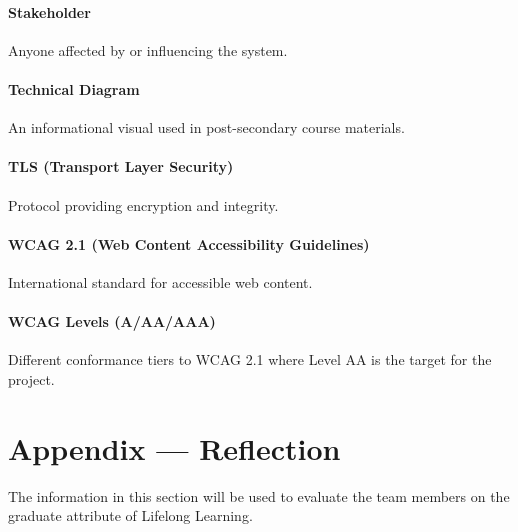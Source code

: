 \documentclass[12pt, titlepage]{article}
\begin{document}
\paragraph*{Stakeholder}
Anyone affected by or influencing the system.

\paragraph*{Technical Diagram}
An informational visual used in post-secondary course materials.

\paragraph*{TLS (Transport Layer Security)}
Protocol providing encryption and integrity.

\paragraph*{WCAG 2.1 (Web Content Accessibility Guidelines)}
International standard for accessible web content.

\paragraph*{WCAG Levels (A/AA/AAA)}
Different conformance tiers to WCAG 2.1 where Level AA is the target
for the project.

\newpage{}
\section*{Appendix --- Reflection}


The information in this section will be used to evaluate the team members on the
graduate attribute of Lifelong Learning.


\\
\end{document}
